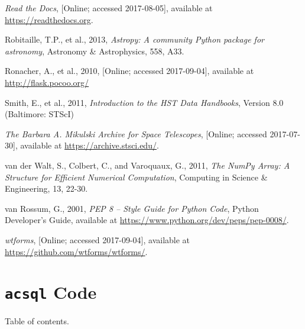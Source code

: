 \documentclass[10pt,journal,compsoc]{IEEEtran}
\begin{document}
\begin{thebibliography}{1}
\emph{Read the Docs}, [Online; accessed 2017-08-05], available at \url{https://readthedocs.org}.

Robitaille, T.P., et al., 2013, \emph{Astropy: A community Python package for astronomy},
Astronomy \& Astrophysics, 558, A33.

Ronacher, A., et al., 2010, [Online; accessed 2017-09-04], available at \url{http://flask.pocoo.org/}

Smith, E., et al., 2011, \emph{Introduction to the HST Data Handbooks}, Version 8.0 (Baltimore: STScI)

\emph{The Barbara A. Mikulski Archive for Space Telescopes}, [Online; accessed 2017-07-30],
available at \url{https://archive.stsci.edu/}.

van der Walt, S., Colbert, C., and Varoquaux, G., 2011, \emph{The NumPy Array: A Structure for
Efficient Numerical Computation}, Computing in Science \& Engineering, 13, 22-30.

van Rossum, G., 2001, \emph{PEP 8 -- Style Guide for Python Code}, Python Developer's Guide,
available at \url{https://www.python.org/dev/peps/pep-0008/}.

\emph{wtforms}, [Online; accessed 2017-09-04], available at \url{https://github.com/wtforms/wtforms/}.

\end{thebibliography}

\onecolumn
\newpage
\appendices
\section{\texttt{acsql} Code}

Table of contents.
\end{document}
